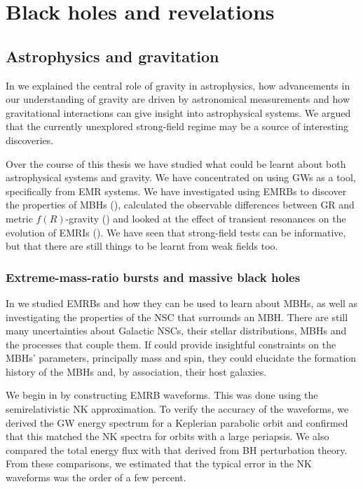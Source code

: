 \chapter{Black holes and revelations}\label{ch:All-good-things}

\section{Astrophysics and gravitation}

In  we explained the central role of gravity in astrophysics, how advancements in our understanding of gravity are driven by astronomical measurements and how gravitational interactions can give insight into astrophysical systems. We argued that the currently unexplored strong-field regime may be a source of interesting discoveries.

Over the course of this thesis we have studied what could be learnt about both astrophysical systems and gravity. We have concentrated on using GWs as a tool, specifically from EMR systems. We have investigated using EMRBs to discover the properties of MBHs (), calculated the observable differences between GR and metric $f(R)$-gravity () and looked at the effect of transient resonances on the evolution of EMRIs (). We have seen that strong-field tests can be informative, but that there are still things to be learnt from weak fields too.

\subsection{Extreme-mass-ratio bursts and massive black holes}\label{sec:Review-EMRBs}

In  we studied EMRBs and how they can be used to learn about MBHs, as well as investigating the properties of the NSC that surrounds an MBH. There are still many uncertainties about Galactic NSCs, their stellar distributions, MBHs and the processes that couple them. If could provide insightful constraints on the MBHs' parameters, principally mass and spin, they could elucidate the formation history of the MBHs and, by association, their host galaxies.

We begin in  by constructing EMRB waveforms. This was done using the semirelativistic NK approximation. To verify the accuracy of the waveforms, we derived the GW energy spectrum for a Keplerian parabolic orbit and confirmed that this matched the NK spectra for orbits with a large periapsis. We also compared the total energy flux with that derived from BH perturbation theory. From these comparisons, we estimated that the typical error in the NK waveforms was the order of a few percent.

